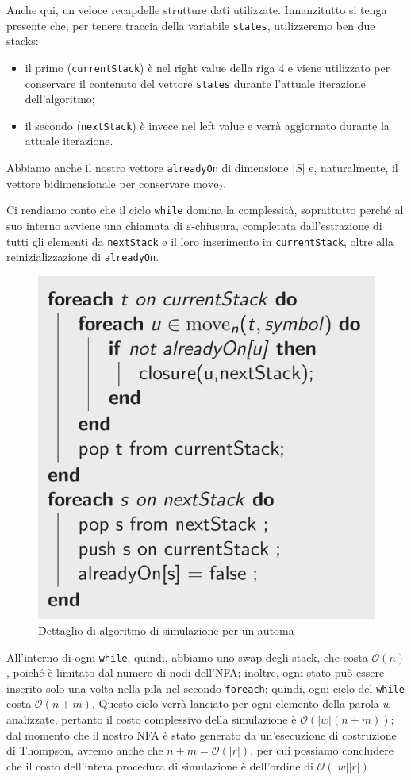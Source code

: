\documentclass[class=book, crop=false, oneside, 12pt]{standalone}
\begin{document}
\noindent Anche qui, un veloce recapdelle strutture dati utilizzate. Innanzitutto si tenga presente che, per tenere traccia della variabile \texttt{states}, utilizzeremo ben due stacks:

\begin{itemize}
    \item il primo (\texttt{currentStack}) è nel right value della riga \(4\) e viene utilizzato per conservare il contenuto del vettore \texttt{states} durante l'attuale iterazione dell'algoritmo;
    \item il secondo (\texttt{nextStack}) è invece  nel left value e verrà aggiornato durante la attuale iterazione.
\end{itemize}

\noindent Abbiamo anche il nostro vettore \texttt{alreadyOn} di dimensione \(|S|\) e, naturalmente, il vettore bidimensionale per conservare \(\textrm{move}_2\).

Ci rendiamo conto che il ciclo \texttt{while} domina la complessità, soprattutto perché al suo interno avviene una chiamata di \(\varepsilon\)-chiusura, completata dall'estrazione di tutti gli elementi da \texttt{nextStack} e il loro inserimento in \texttt{currentStack}, oltre alla reinizializzazione di \texttt{alreadyOn}.

\begin{figure}
    \centering
    \includegraphics[width=.6\textwidth,keepaspectratio]{algoritmo_simulazione_nfa_2}
    \caption{Dettaglio di algoritmo di simulazione per un automa}
    \label{algoritmo_simulazione_nfa_2}
\end{figure}

All'interno di ogni \texttt{while}, quindi, abbiamo uno swap degli stack, che costa \(\mathcal{O}(n)\), poiché è limitato dal numero di nodi dell'NFA; inoltre, ogni stato può essere inserito solo una volta nella pila nel secondo \texttt{foreach}; quindi, ogni ciclo del \texttt{while} costa \(\mathcal{O}(n + m)\). Questo ciclo verrà lanciato per ogni elemento della parola \(w\) analizzate, pertanto il costo complessivo della simulazione è \(\mathcal{O}(|w|(n + m))\); dal momento che il nostro NFA è stato generato da un'esecuzione di costruzione di Thompson, avremo anche che \(n + m = \mathcal{O}(|r|)\), per cui possiamo concludere che il costo  dell'intera procedura di simulazione è dell'ordine di \(\mathcal{O}(|w||r|)\).
\end{document}
